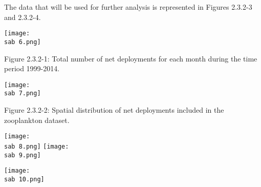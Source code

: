\documentclass[letterpaper,portrait,12pt]{scrartcl}
\numberwithin{equation}{section}		%
\numberwithin{figure}{section}			%
\numberwithin{table}{section}				%
\newcommand{\sab}{\string~/ecomod_data/mpa/sab/}   %
\begin{document}
The data that will be used for further analysis is represented in Figures 2.3.2-3 and 2.3.2-4.














\texttt{[image: \\sab 6.png]}





Figure 2.3.2-1: Total number of net deployments for each month during the time period 1999-2014.














\texttt{[image: \\sab 7.png]}










Figure 2.3.2-2: Spatial distribution of net deployments included in the zooplankton dataset. 







































\texttt{[image: \\sab 8.png]}
\texttt{[image: \\sab 9.png]}










\texttt{[image: \\sab 10.png]}
\end{document}
